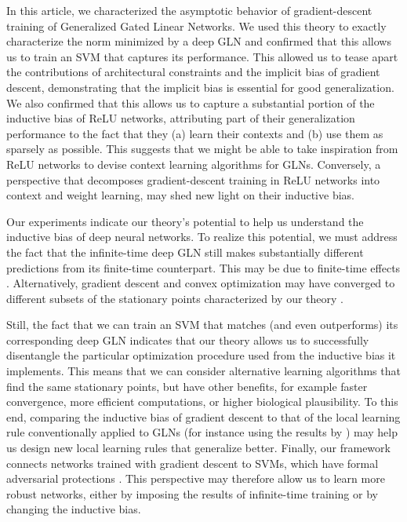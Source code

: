 \documentclass{article}
\theoremstyle{plain}
\theoremstyle{definition}
\theoremstyle{remark}
\begin{document}
In this article, we characterized the asymptotic behavior of gradient-descent training of Generalized Gated Linear Networks.
We used this theory to exactly characterize the norm minimized by a deep GLN and confirmed that this allows us to train an SVM that captures its performance.
This allowed us to tease apart the contributions of architectural constraints and the implicit bias of gradient descent, demonstrating that the implicit bias is essential for good generalization.
We also confirmed that this allows us to capture a substantial portion of the inductive bias of ReLU networks, attributing part of their generalization performance to the fact that they (a) learn their contexts and (b) use them as sparsely as possible.
This suggests that we might be able to take inspiration from ReLU networks to devise context learning algorithms for GLNs.
Conversely, a perspective that decomposes gradient-descent training in ReLU networks into context and weight learning, may shed new light on their inductive bias.

Our experiments indicate our theory's potential to help us understand the inductive bias of deep neural networks.
To realize this potential, we must address the fact that the infinite-time deep GLN still makes substantially different predictions from its finite-time counterpart.
This may be due to finite-time effects \citep{arora_implicit_2019}.
Alternatively, gradient descent and convex optimization may have converged to different subsets of the stationary points characterized by our theory \citep{nacson_lexicographic_2019}.

Still, the fact that we can train an SVM that matches (and even outperforms) its corresponding deep GLN indicates that our theory allows us to successfully disentangle the particular optimization procedure used from the inductive bias it implements.
This means that we can consider alternative learning algorithms that find the same stationary points, but have other benefits, for example faster convergence, more efficient computations, or higher biological plausibility.
To this end, comparing the inductive bias of gradient descent to that of the local learning rule conventionally applied to GLNs (for instance using the results by \citet{ji_implicit_2019}) may help us design new local learning rules that generalize better.
Finally, our framework connects networks trained with gradient descent to SVMs, which have formal adversarial protections \citep{mangasarian_arbitrary-norm_1999,gentile_robustness_2003}.
This perspective may therefore allow us to learn more robust networks, either by imposing the results of infinite-time training or by changing the inductive bias.
\end{document}
